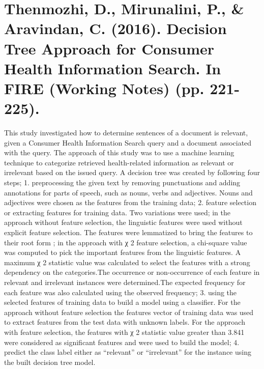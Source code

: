 \documentclass[]{article}
\begin{document}
\section{Thenmozhi, D., Mirunalini, P., \& Aravindan, C. (2016). Decision Tree Approach for Consumer Health Information Search. In FIRE (Working Notes) (pp. 221-225).}

This study investigated how to determine sentences of a document is relevant, given a Consumer Health Information Search query and a document associated with the query. The approach of this study was to use a machine learning technique to categorize retrieved health-related information as relevant or irrelevant based on the issued query. A decision tree was created by following four steps; 1. preprocessing the given text by removing punctuations and adding annotations for parts of speech, such as nouns, verbs and adjectives. Nouns and adjectives were chosen as the features from the training data; 2. feature selection or extracting features for training data. Two variations were used; in the approach without feature selection, the linguistic features were used without explicit feature selection. The features were lemmatized to bring the features to their root form ; in the approach with χ 2 feature selection, a chi-square value was computed to pick the important features from the linguistic features. A maximum χ 2 statistic value was calculated to select the features with a strong dependency on the categories.The occurrence or non-occurrence of each feature in relevant and irrelevant instances were determined.The expected frequency for each feature was also calculated using the observed frequency; 3. using the selected features of training data to build a model using a classifier. For the approach without feature selection the features vector of training data was used to extract features from the test data with unknown labels. For the approach with feature selection, the features with  χ 2 statistic value greater than 3.841 were considered as significant features and were used to build the model; 4. predict the class label either as “relevant” or “irrelevant” for the instance using the built decision tree model. 
 
\end{document}
